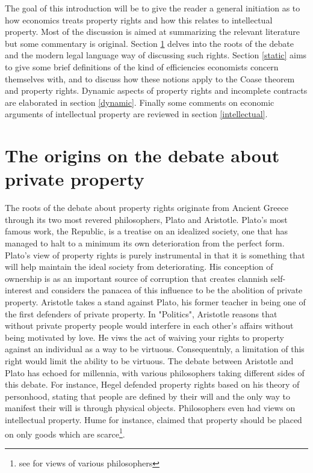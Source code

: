 

The goal of this introduction will be to give the reader a general initiation as to how economics treats property rights and how this relates to intellectual property. Most of the discussion is aimed at summarizing the relevant literature but some commentary is original. Section \ref{origins} delves into the roots of the debate and the modern legal language way of discussing such rights. Section \ref{static} aims to give some brief definitions of the kind of efficiencies economists concern themselves with, and to discuss how these notions apply to the Coase theorem and property rights. Dynamic aspects of property rights and incomplete contracts are elaborated in section \ref{dynamic}. Finally some comments on economic arguments of intellectual property are reviewed in section \ref{intellectual}.

\section{The origins on the debate about private property} \label{origins}

The roots of the debate about property rights originate from Ancient Greece through its two most revered philosophers, Plato and Aristotle. 
Plato's most famous work, the Republic, is a treatise on an idealized society, one that has managed to halt to a minimum its own deterioration from the perfect form. Plato's view of property rights is purely instrumental in that it is something that will help maintain the ideal society from deteriorating. His conception of ownership is as an important source of corruption that creates clannish self-interest and considers the panacea of this influence to be the abolition of private property. Aristotle takes a stand against Plato, his former teacher in being one of the first defenders of private property. In "Politics",  Aristotle reasons that without private property people would interfere in each other’s affairs without being motivated by love. He viws the act of waiving your rights to property against an individual as a way to be virtuous. Consequentnly, a limitation of this right would limit the ability to be virtuous. The debate between Aristotle and Plato has echoed for millennia, with various philosophers taking different sides of this debate. For instance, Hegel defended property rights based on his theory of personhood, stating that people are defined by their will and the only way to manifest their will is through physical objects. Philosophers even had views on intellectual property. Hume for instance, claimed that property should be placed on only goods which are scarce\footnote{see \cite{plant1934economic} for views of various philosophers}.

